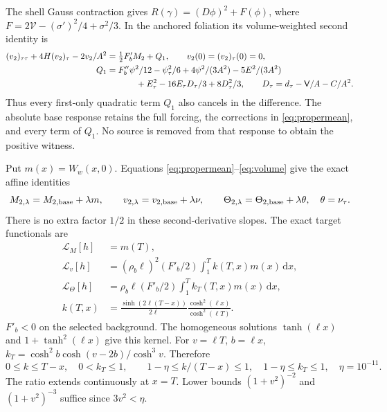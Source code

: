 \documentclass[11pt]{article}
\newcommand{\dd}{\mathrm d}
\newcommand{\cV}{\mathcal V}
\begin{document}
The shell Gauss contraction \cite{SMS} gives
$R(\gamma)=(D\phi)^2+F(\phi)$, where
$F=2\cV-(\sigma')^2/4+\sigma^2/3$. In the anchored foliation its
volume-weighted second identity is
\begin{align}
 (v_2)_{\tau\tau}+4H(v_2)_\tau-2v_2/A^2
   &=\tfrac12F'_bM_2+Q_1,\qquad v_2(0)=(v_2)_\tau(0)=0,
 \label{eq:volume}\\
 Q_1&=F''_b\psi^2/12-\psi_\tau^2/6+4\psi^2/(3A^2)-5E^2/(3A^2)
 \nonumber\\
 &\hspace{12mm}+E_\tau^2-16E_\tau D_\tau/3+8D_\tau^2/3,
 \qquad D_\tau=d_\tau-\mathsf V/A-C/A^2.\nonumber
\end{align}
Thus every first-only quadratic term $Q_1$ also cancels in the difference.
The absolute base response retains the full forcing, the corrections in
\eqref{eq:propermean}, and every term of $Q_1$. No source is removed
from that response to obtain the positive witness.

Put $m(x)=W_w(x,0)$. Equations \eqref{eq:propermean}--\eqref{eq:volume}
give the exact affine identities
\begin{equation}
 M_{2,\lambda}=M_{2,\rm base}+\lambda m,\qquad
 v_{2,\lambda}=v_{2,\rm base}+\lambda\nu,\qquad
 \Theta_{2,\lambda}=\Theta_{2,\rm base}+\lambda\theta,\quad
 \theta=\nu_\tau. \label{eq:affine}
\end{equation}
There is no extra factor $1/2$ in these second-derivative slopes.
The exact target functionals are
\begin{align}
 \mathcal L_M[h]&=m(T),\nonumber\\
 \mathcal L_v[h]&=(\rho_b\ell)^2(F'_b/2)\int_1^T k(T,x)m(x)\,\dd x,
 \label{eq:slopes}\\
 \mathcal L_\Theta[h]&=\rho_b\ell(F'_b/2)\int_1^T k_T(T,x)m(x)\,\dd x,
 \nonumber\\
 k(T,x)&=\frac{\sinh(2\ell(T-x))}{2\ell}
              \frac{\cosh^2(\ell x)}{\cosh^2(\ell T)}.\nonumber
\end{align}
$F'_b<0$ on the selected background. The homogeneous solutions
$\tanh(\ell x)$ and $1+\tanh^2(\ell x)$ give this kernel. For
$v=\ell T$, $b=\ell x$,
$k_T=\cosh^2b\cosh(v-2b)/\cosh^3v$. Therefore
\begin{equation}
 0\le k\le T-x,\quad 0<k_T\le1,\qquad
 1-\eta\le k/(T-x)\le1,\quad 1-\eta\le k_T\le1,
 \quad \eta=10^{-11}. \label{eq:kernelcaps}
\end{equation}
The ratio extends continuously at $x=T$. Lower bounds
$(1+v^2)^{-2}$ and $(1+v^2)^{-3}$ suffice since $3v^2<\eta$.
\end{document}
